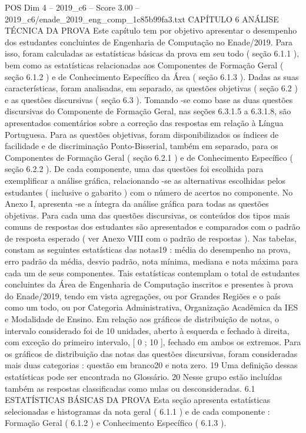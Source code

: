 \begin{textsample}{POS Dim 4 – 2019\_c6 – Score 3.00 – 2019\_c6/enade\_2019\_eng\_comp\_1c85b99fa3.txt}  \label{ex:f4_pos_096}
CAPÍTULO 6 ANÁLISE TÉCNICA DA PROVA Este capítulo tem por objetivo apresentar o desempenho dos estudantes concluintes de Engenharia de Computação no Enade/2019.
Para isso, foram calculadas as estatísticas básicas da prova em seu todo ( seção 6.1.1 ), bem como as estatísticas relacionadas aos Componentes de Formação Geral ( seção 6.1.2 ) e de Conhecimento Específico da Área ( seção 6.1.3 ).
Dadas as suas características, foram analisadas, em separado, as questões objetivas ( seção 6.2 ) e as questões discursivas ( seção 6.3 ).
Tomando -se como base as duas questões discursivas do Componente de Formação Geral, nas seções 6.3.1.5 a 6.3.1.8, são apresentados comentários sobre a correção das respostas em relação à Língua Portuguesa.
Para as questões objetivas, foram disponibilizados os índices de facilidade e de discriminação Ponto-Bisserial, também em separado, para os Componentes de Formação Geral ( seção 6.2.1 ) e de Conhecimento Específico ( seção 6.2.2 ).
De cada componente, uma das questões foi escolhida para exemplificar a análise gráfica, relacionando -se as alternativas escolhidas pelos estudantes ( inclusive o gabarito ) com o número de acertos no componente.
No Anexo I, apresenta -se a íntegra da análise gráfica para todas as questões objetivas.
Para cada uma das questões discursivas, os conteúdos dos tipos mais comuns de respostas dos estudantes são apresentados e comparados com o padrão de resposta esperado ( ver Anexo VIII com o padrão de respostas ).
Nas tabelas, constam as seguintes estatísticas das notas19 : média do desempenho na prova, erro padrão da média, desvio padrão, nota mínima, mediana e nota máxima para cada um de seus componentes.
Tais estatísticas contemplam o total de estudantes concluintes da Área de Engenharia de Computação inscritos e presentes à prova do Enade/2019, tendo em vista agregações, ou por Grandes Regiões e o país como um todo, ou por Categoria Administrativa, Organização Acadêmica da IES e Modalidade de Ensino.
Em relação aos gráficos de distribuição de notas, o intervalo considerado foi de 10 unidades, aberto à esquerda e fechado à direita, com exceção do primeiro intervalo, [ 0 ; 10 ], fechado em ambos os extremos.
Para os gráficos de distribuição das notas das questões discursivas, foram consideradas mais duas categorias : questão em branco20 e nota zero. 19 Uma definição dessas estatísticas pode ser encontrada no Glossário. 20 Nesse grupo estão incluídas também as respostas classificadas como nulas ou desconsideradas. 6.1 ESTATÍSTICAS BÁSICAS DA PROVA Esta seção apresenta estatísticas selecionadas e histogramas da nota geral ( 6.1.1 ) e de cada componente : Formação Geral ( 6.1.2 ) e Conhecimento Específico ( 6.1.3 ).

\end{textsample}
